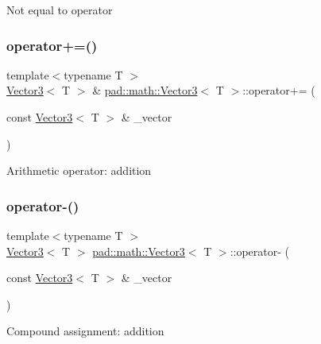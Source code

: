 Not equal to operator \mbox{\label{structpad_1_1math_1_1_vector3_a250f7ccf1fd5f387dd8292c224b08c9e}} 
\subsubsection{\texorpdfstring{operator+=()}{operator+=()}}
{\footnotesize\ttfamily template$<$typename T $>$ \\
\mbox{\hyperlink{structpad_1_1math_1_1_vector3}{Vector3}}$<$ T $>$ \& \mbox{\hyperlink{structpad_1_1math_1_1_vector3}{pad\+::math\+::\+Vector3}}$<$ T $>$\+::operator+= (\begin{DoxyParamCaption}\item[{const \mbox{\hyperlink{structpad_1_1math_1_1_vector3}{Vector3}}$<$ T $>$ \&}]{\+\_\+vector }\end{DoxyParamCaption})}

Arithmetic operator\+: addition \mbox{\label{structpad_1_1math_1_1_vector3_acce2697e7151ebb1c15840eb36535e12}} 
\subsubsection{\texorpdfstring{operator-\/()}{operator-()}}
{\footnotesize\ttfamily template$<$typename T $>$ \\
\mbox{\hyperlink{structpad_1_1math_1_1_vector3}{Vector3}}$<$ T $>$ \mbox{\hyperlink{structpad_1_1math_1_1_vector3}{pad\+::math\+::\+Vector3}}$<$ T $>$\+::operator-\/ (\begin{DoxyParamCaption}\item[{const \mbox{\hyperlink{structpad_1_1math_1_1_vector3}{Vector3}}$<$ T $>$ \&}]{\+\_\+vector }\end{DoxyParamCaption})}

Compound assignment\+: addition \mbox{\label{structpad_1_1math_1_1_vector3_abc2512b1a4d062e231d32c6de4a19d3e}} 
